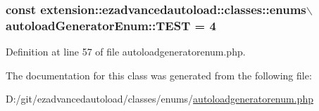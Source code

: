 \hypertarget{classextension_1_1ezadvancedautoload_1_1classes_1_1enums_1_1autoload_generator_enum_a5ebe36a26a6f9d104d4d49dcdce0fbfe}{
\subsubsection[{\-T\-E\-S\-T}]{\setlength{\rightskip}{0pt plus 5cm}const extension\-::ezadvancedautoload\-::classes\-::enums$\backslash${\bf autoload\-Generator\-Enum\-::\-T\-E\-S\-T} = 4}}\label{classextension_1_1ezadvancedautoload_1_1classes_1_1enums_1_1autoload_generator_enum_a5ebe36a26a6f9d104d4d49dcdce0fbfe}


\-Definition at line 57 of file autoloadgeneratorenum.\-php.



\-The documentation for this class was generated from the following file\-:\begin{DoxyCompactItemize}
\item 
\-D\-:/git/ezadvancedautoload/classes/enums/\hyperlink{autoloadgeneratorenum_8php}{autoloadgeneratorenum.\-php}\end{DoxyCompactItemize}
